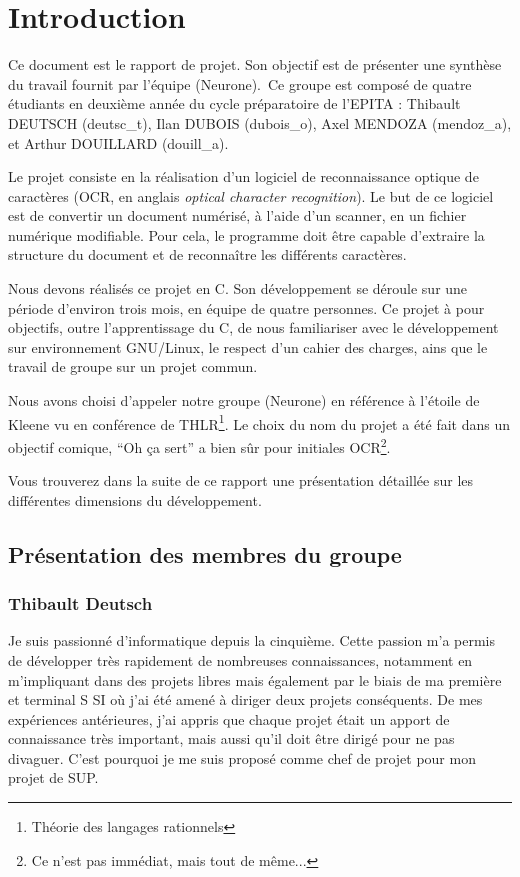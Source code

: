 \documentclass[11pt]{report}
\begin{document}
\newpage
{}
\tableofcontents

\chapter{Introduction}

Ce document est le rapport de projet. Son objectif est de présenter une synthèse du travail fournit par l’équipe (Neurone)\up{*}.\ Ce groupe est composé de quatre étudiants en deuxième année du cycle préparatoire de l’EPITA : Thibault DEUTSCH (deutsc\_t), Ilan DUBOIS (dubois\_o),  Axel MENDOZA (mendoz\_a), et Arthur DOUILLARD (douill\_a).

Le projet consiste en la réalisation d’un logiciel de reconnaissance optique de caractères (OCR, en anglais \emph{optical character recognition}). Le but de ce logiciel est de convertir un document numérisé, à l'aide d'un scanner, en un fichier numérique modifiable. Pour cela, le programme doit être capable d'extraire la structure du document et de reconnaître les différents caractères.

Nous devons réalisés ce projet en C. Son développement se déroule sur une période d’environ trois mois, en équipe de quatre personnes. Ce projet à pour objectifs, outre l'apprentissage du C, de nous familiariser avec le développement sur environnement GNU/Linux, le respect d'un cahier des charges, ains que le travail de groupe sur un projet commun.

Nous avons choisi d’appeler notre groupe (Neurone)\up{*} en référence à l’étoile de Kleene vu en conférence de THLR\footnote{Théorie des langages rationnels}. Le choix du nom du projet a été fait dans un objectif comique, ``Oh ça sert'' a bien sûr pour initiales OCR\footnote{Ce n'est pas immédiat, mais tout de même...}.

Vous trouverez dans la suite de ce rapport une présentation détaillée sur les différentes dimensions du développement.

\newpage
\section{Présentation des membres du groupe}

\subsection{Thibault Deutsch}

Je suis passionné d’informatique depuis la cinquième. Cette passion m’a permis de développer très rapidement de nombreuses connaissances, notamment en m’impliquant dans des projets libres mais également par le biais de ma première et terminal S SI où j’ai été amené à diriger deux projets conséquents. De mes expériences antérieures, j’ai appris que chaque projet était un apport de connaissance très important, mais aussi qu’il doit être dirigé pour ne pas divaguer. C’est pourquoi je me suis proposé comme chef de projet pour mon projet de SUP.
\end{document}
